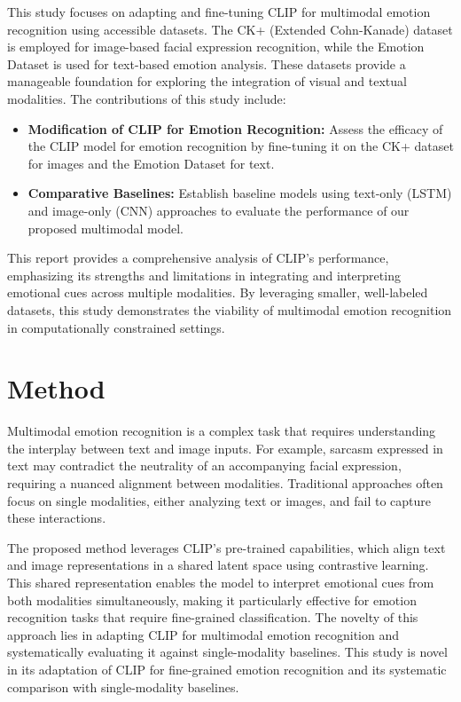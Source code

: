 \documentclass{article}
\theoremstyle{plain}
\theoremstyle{definition}
\theoremstyle{remark}
\begin{document}
This study focuses on adapting and fine-tuning CLIP for multimodal emotion recognition using accessible datasets. The CK+ (Extended Cohn-Kanade) dataset is employed for image-based facial expression recognition, while the Emotion Dataset is used for text-based emotion analysis. These datasets provide a manageable foundation for exploring the integration of visual and textual modalities. The contributions of this study include: 
\begin{itemize} 
    \item \textbf{Modification of CLIP for Emotion Recognition:} Assess the efficacy of the CLIP model for emotion recognition by fine-tuning it on the CK+ dataset for images and the Emotion Dataset for text. 
    \item \textbf{Comparative Baselines:} Establish baseline models using text-only (LSTM) and image-only (CNN) approaches to evaluate the performance of our proposed multimodal model. 
\end{itemize}

This report provides a comprehensive analysis of CLIP’s performance, emphasizing its strengths and limitations in integrating and interpreting emotional cues across multiple modalities. By leveraging smaller, well-labeled datasets, this study demonstrates the viability of multimodal emotion recognition in computationally constrained settings.

\section{Method}
Multimodal emotion recognition is a complex task that requires understanding the interplay between text and image inputs. For example, sarcasm expressed in text may contradict the neutrality of an accompanying facial expression, requiring a nuanced alignment between modalities. Traditional approaches often focus on single modalities, either analyzing text or images, and fail to capture these interactions.

The proposed method leverages CLIP’s pre-trained capabilities, which align text and image representations in a shared latent space using contrastive learning. This shared representation enables the model to interpret emotional cues from both modalities simultaneously, making it particularly effective for emotion recognition tasks that require fine-grained classification. The novelty of this approach lies in adapting CLIP for multimodal emotion recognition and systematically evaluating it against single-modality baselines. This study is novel in its adaptation of CLIP for fine-grained emotion recognition and its systematic comparison with single-modality baselines.
\end{document}
